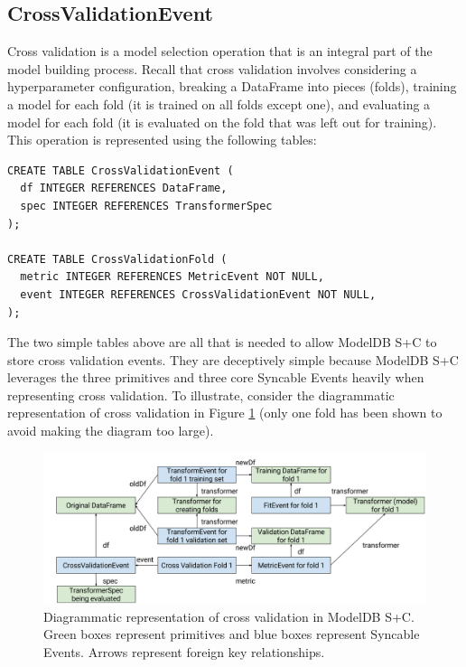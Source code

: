 \subsection{CrossValidationEvent}
Cross validation is a model selection operation that is an integral part of the
model building process. Recall that cross validation involves considering a hyperparameter
configuration, breaking a DataFrame into pieces (folds), training a model for each fold (it
is trained on all folds except one), and evaluating a model for each fold (it is evaluated on
the fold that was left out for training). This operation is represented using the following tables:

\begin{verbatim}
CREATE TABLE CrossValidationEvent (
  df INTEGER REFERENCES DataFrame,
  spec INTEGER REFERENCES TransformerSpec
);

CREATE TABLE CrossValidationFold (
  metric INTEGER REFERENCES MetricEvent NOT NULL,
  event INTEGER REFERENCES CrossValidationEvent NOT NULL,
);
\end{verbatim}

The two simple tables above are all that is needed to allow ModelDB S+C to store
cross validation events. They are deceptively simple because ModelDB S+C leverages
the three primitives and three core Syncable Events heavily when representing cross validation.
To illustrate, consider the diagrammatic representation of cross validation in Figure
\ref{fig:cross_validation_event} (only one fold has been shown to avoid making the diagram too large).

\begin{figure}
  \centering
  \includegraphics[width=5.0in]{cross_validation_event}
  \caption{
    Diagrammatic representation of cross validation in ModelDB S+C. Green boxes
    represent primitives and blue boxes represent Syncable Events. Arrows
    represent foreign key relationships.
  }
  \label{fig:cross_validation_event}
\end{figure}

